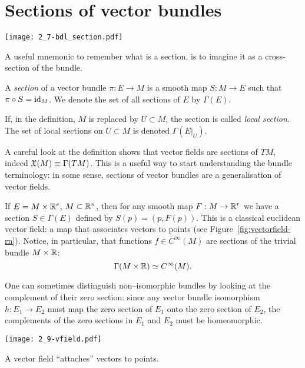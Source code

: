 \section{Sections of vector bundles}

\begin{marginfigure}
  \texttt{[image: 2\_7-bdl\_section.pdf]}
  \caption{A useful mnemonic to remember what is a section, is to imagine it as a cross-section of the bundle.}
\end{marginfigure}

\begin{definition}
  A \emph{section} of a vector bundle $\pi:E \to M$ is a smooth map $S:M \to E$ such that $\pi\circ S = \operatorname{id}_M$. We denote the set of all sections of $E$ by $\Gamma(E)$.

  If, in the definition, $M$ is replaced by $U\subset M$, the section is called \emph{local section}. The set of local sections on $U\subset M$ is denoted $\Gamma(E|_U)$.
\end{definition}

\begin{remark}
  A careful look at the definition shows that vector fields are sections of $TM$, indeed $\mathfrak{X}(M) \equiv \Gamma(TM)$.
  This is a useful way to start understanding the bundle terminology: in some sense, sections of vector bundles are a generalisation of vector fields.
\end{remark}

\begin{example}
If $E = M\times \mathbb{R}^r$, $M\subset\mathbb{R}^n$, then for any smooth map $F: M\to\mathbb{R}^r$ we have a section $S\in\Gamma(E)$ defined by $S(p) = (p, F(p))$. This is a classical euclidean vector field: a map that associates vectors to points (see Figure~\ref{fig:vectorfield-rn}).
  Notice, in particular, that functions $f\in C^\infty(M)$ are sections of the trivial bundle $M\times\mathbb{R}$:
  \begin{equation}
    \Gamma(M\times\mathbb{R}) \simeq C^\infty(M).
  \end{equation}
\end{example}

One can sometimes distinguish non--isomorphic bundles by looking at the complement of their zero section: since any vector bundle isomorphism $h:E_1\to E_2$ must map the zero section of $E_1$ onto the zero section of $E_2$, the complements of the zero sections in $E_1$ and $E_2$ must be homeomorphic.

\begin{marginfigure}
    \texttt{[image: 2\_9-vfield.pdf]}
    \caption{A vector field ``attaches'' vectors to points.}%
    \label{fig:vectorfield-rn}
\end{marginfigure}

